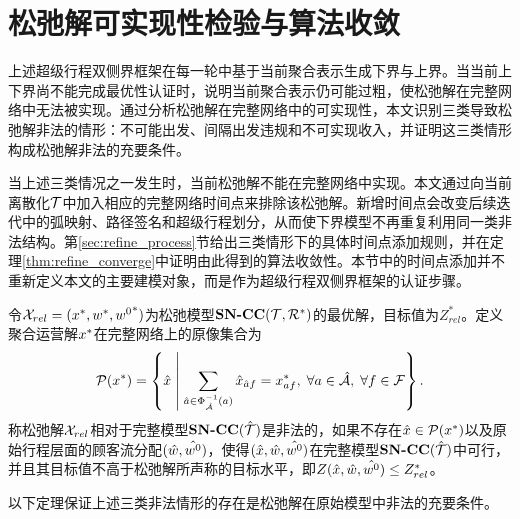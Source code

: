 \section{松弛解可实现性检验与算法收敛}\label{sec:refinement_wrapper}
\label{sec:refinement}

上述超级行程双侧界框架在每一轮中基于当前聚合表示生成下界与上界。当当前上下界尚不能完成最优性认证时，说明当前聚合表示仍可能过粗，使松弛解在完整网络中无法被实现。通过分析松弛解在完整网络中的可实现性，本文识别三类导致松弛解非法的情形：不可能出发、间隔出发违规和不可实现收入，并证明这三类情形构成松弛解非法的充要条件。

当上述三类情况之一发生时，当前松弛解不能在完整网络中实现。本文通过向当前离散化$\mathcal{T}$中加入相应的完整网络时间点来排除该松弛解。新增时间点会改变后续迭代中的弧映射、路径签名和超级行程划分，从而使下界模型不再重复利用同一类非法结构。第\ref{sec:refine_process}节给出三类情形下的具体时间点添加规则，并在定理\ref{thm:refine_converge}中证明由此得到的算法收敛性。本节中的时间点添加并不重新定义本文的主要建模对象，而是作为超级行程双侧界框架的认证步骤。

\begin{definition}
\label{def:illegal_solution}
令$\mathcal{X}_{rel} = (x^*, w^*, {w^0}^*)$为松弛模型$\textbf{SN-CC}({\mathcal{T}, \mathcal{R}^{*}})$的最优解，目标值为$Z_{rel}^*$。定义聚合运营解$x^*$在完整网络上的原像集合为
\[
    \mathcal{P}(x^*) = \left\{\hat{x} \;\middle|\; \sum_{\hat{a}\in\Phi_{\hat{\mathcal{A}}}^{-1}(a)} \hat{x}_{\hat{a}f} = x^*_{af},\; \forall a\in\hat{\mathcal{A}},\; \forall f\in\mathcal{F} \right\}.
\]
称松弛解$\mathcal{X}_{rel}$相对于完整模型$\textbf{SN-CC}({\hat{\mathcal{T}}})$是非法的，如果不存在$\hat{x}\in\mathcal{P}(x^*)$以及原始行程层面的顾客流分配$(\hat{w}, \hat{{w^0}})$，使得$(\hat{x}, \hat{w}, \hat{{w^0}})$在完整模型$\textbf{SN-CC}({\hat{\mathcal{T}}})$中可行，并且其目标值不高于松弛解所声称的目标水平，即$Z(\hat{x}, \hat{w}, \hat{{w^0}}) \le Z_{rel}^*$。
\end{definition}





以下定理保证上述三类非法情形的存在是松弛解在原始模型中非法的充要条件。



